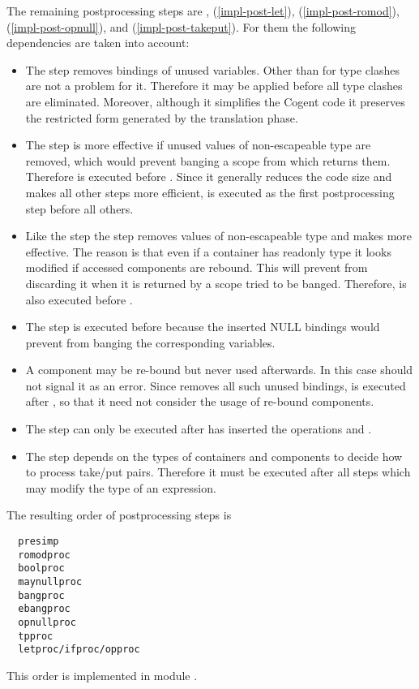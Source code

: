 The remaining postprocessing steps are , (\ref{impl-post-let}),  (\ref{impl-post-romod}),
 (\ref{impl-post-opnull}), and  (\ref{impl-post-takeput}).
For them the following dependencies are taken into account:
\begin{itemize}
\item The  step removes bindings of unused variables. Other than for  type clashes are not a problem
for it. Therefore it may be applied before all type clashes are eliminated. Moreover, although it simplifies the Cogent code it
preserves the restricted form generated by the translation phase.
\item The  step is more effective if unused values of non-escapeable type are removed, which would prevent banging
a scope from which returns them. Therefore  is executed before . Since it generally reduces the
code size and makes all other steps more efficient,  is executed as the first postprocessing step before all others.
\item Like the  step the  step removes values of non-escapeable type and makes 
more effective. The reason is that even if a container has readonly type it looks modified if accessed components are rebound.
This will prevent  from discarding it when it is returned by a scope tried to be banged. Therefore, 
is also executed before .
\item The  step is executed before  because the inserted NULL bindings would prevent 
from banging the corresponding variables.
\item A component may be re-bound but never used afterwards. In this case  should not signal it as an error.
Since  removes all such unused bindings,  is executed after , so that it need not
consider the usage of re-bound components.
\item The  step can only be executed after  has inserted the operations  and
.
\item The  step depends on the types of containers and components to decide how to process take/put pairs. Therefore
it must be executed after all steps which may modify the type of an expression.
\end{itemize}

The resulting order of postprocessing steps is
\begin{verbatim}
  presimp
  romodproc
  boolproc
  maynullproc
  bangproc
  ebangproc
  opnullproc
  tpproc
  letproc/ifproc/opproc
\end{verbatim}
This order is implemented in module .
